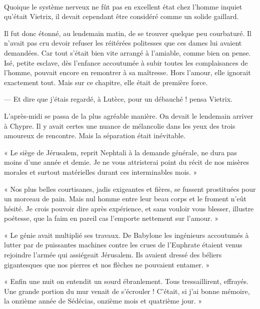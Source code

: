 \documentclass[a4paper, 11pt, oneside, polutonikogreek, french]{article}
\begin{document}
\paragraph{}
Quoique le système nerveux ne fût pas en excellent état chez l'homme inquiet qu'était Vietrix, il devait cependant être considéré comme un solide gaillard.

Il fut donc étonné, au lendemain matin, de se trouver quelque peu courbaturé. Il n'avait pas cru devoir refuser les réitérées politesses que ces dames lui avaient demandées. Car tout s'était bien vite arrangé à l'amiable, comme bien on pense. Isé, petite esclave, dès l'enfance accoutumée à subir toutes les complaisances de l'homme, pouvait encore en remontrer à sa maîtresse. Hors l'amour, elle ignorait exactement tout. Mais sur ce chapitre, elle était de première force.

--- Et dire que j'étais regardé, à Lutèce, pour un débauché ! pensa Vietrix.

\bigskip
\centerline{\EightStarTaper}
\centerline{\EightStarTaper\EightStarTaper}
\bigskip

L'après-midi se passa de la plus agréable manière. On devait le lendemain arriver à Chypre. Il y avait certes une nuance de mélancolie dans les yeux des trois amoureux de rencontre. Mais la séparation était inévitable.

\bigskip
\centerline{\EightStarTaper}
\centerline{\EightStarTaper\EightStarTaper}
\bigskip

« Le siège de Jérusalem, reprit Nephtali à la demande générale, ne dura pas moins d'une année et demie. Je ne vous attristerai point du récit de nos misères morales et surtout matérielles durant ces interminables mois. »

« Nos plus belles courtisanes, jadis exigeantes et fières, se fussent prostituées pour un morceau de pain. Mais nul homme entre leur beau corps et le froment n'eût hésité. Je crois pouvoir dire après expérience, et sans vouloir vous blesser, illustre poétesse, que la faim en pareil cas l'emporte nettement sur l'amour. »

« Le génie avait multiplié ses travaux. De Babylone les ingénieurs accoutumés à lutter par de puissantes machines contre les crues de l'Euphrate étaient venus rejoindre l'armée qui assiégeait Jérusalem. Ils avaient dressé des béliers gigantesques que nos pierres et nos flèches ne pouvaient entamer. »

« Enfin une nuit on entendit un sourd ébranlement. Tous tressaillirent, effrayés. Une grande portion du mur venait de s'écrouler ! C'était, si j'ai bonne mémoire, la onzième année de Sédécias, onzième mois et quatrième jour. »
\end{document}
